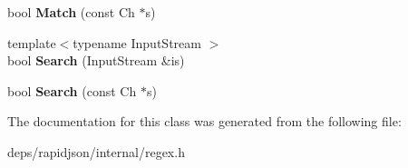 \begin{DoxyCompactItemize}
\item 
bool {\bfseries Match} (const Ch $\ast$s)\hypertarget{classinternal_1_1_generic_regex_search_a9d3fe83905549d2fd4c513b8eacd14de}{}\label{classinternal_1_1_generic_regex_search_a9d3fe83905549d2fd4c513b8eacd14de}

\item 
{\footnotesize template$<$typename Input\+Stream $>$ }\\bool {\bfseries Search} (Input\+Stream \&is)\hypertarget{classinternal_1_1_generic_regex_search_a766c684321471b468ff468648f186cf0}{}\label{classinternal_1_1_generic_regex_search_a766c684321471b468ff468648f186cf0}

\item 
bool {\bfseries Search} (const Ch $\ast$s)\hypertarget{classinternal_1_1_generic_regex_search_a97398161c60f3ed3e4aabaff952c6f1e}{}\label{classinternal_1_1_generic_regex_search_a97398161c60f3ed3e4aabaff952c6f1e}

\end{DoxyCompactItemize}


The documentation for this class was generated from the following file\+:\begin{DoxyCompactItemize}
\item 
deps/rapidjson/internal/regex.\+h\end{DoxyCompactItemize}
